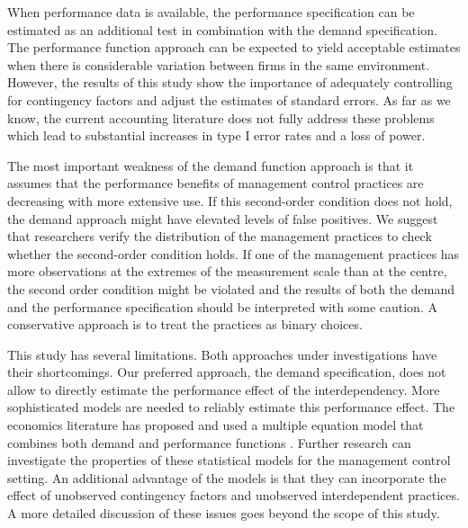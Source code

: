 \documentclass[12pt]{article}
\begin{document}
When performance data is available, the performance specification can be estimated as an additional test in combination with the demand specification. The performance function approach can be expected to yield acceptable estimates when there is considerable variation between firms in the same environment. However, the results of this study show the importance of adequately controlling for contingency factors and adjust the estimates of standard errors. As far as we know, the current accounting literature does not fully address these problems which lead to substantial increases in type I error rates and a loss of power.

The most important weakness of the demand function approach is that it assumes that the performance benefits of management control practices are decreasing with more extensive use. If this second-order condition does not hold, the demand approach might have elevated levels of false positives. We suggest that researchers verify the distribution of the management practices to check whether the second-order condition holds. If one of the management practices has more observations at the extremes of the measurement scale than at the centre, the second order condition might be violated and the results of both the demand and the performance specification should be interpreted with some caution. A conservative approach is to treat the practices as binary choices. 

This study has several limitations. Both approaches under investigations have their shortcomings. Our preferred approach, the demand specification, does not allow to directly estimate the performance effect of the interdependency. More sophisticated models are needed to reliably estimate this performance effect. The economics literature has proposed and used a multiple equation model that combines both demand and performance functions \citep{athey_empirical_1998, gentzkow_valuing_2007, kretschmer_competitive_2012, miravete_innovation_2006}. Further research can investigate the properties of these statistical models for the management control setting. An additional advantage of the models is that they can incorporate the effect of unobserved contingency factors and unobserved interdependent practices. A more detailed discussion of these issues goes beyond the scope of this study.
\end{document}

